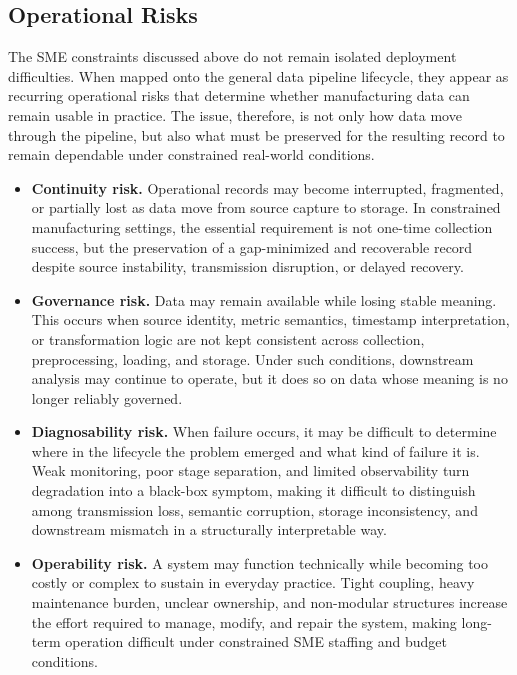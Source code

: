 \documentclass[systems,article,submit,pdftex,moreauthors]{Definitions/mdpi}
\begin{document}
\subsection{Operational Risks}
\label{sec:operational_risks}

The SME constraints discussed above do not remain isolated deployment difficulties. When mapped onto the general data pipeline lifecycle, they appear as recurring operational risks that determine whether manufacturing data can remain usable in practice. The issue, therefore, is not only how data move through the pipeline, but also what must be preserved for the resulting record to remain dependable under constrained real-world conditions.

\begin{itemize}[leftmargin=1.5em]
    \item[\textbf{RSK1.}] \textbf{Continuity risk.} Operational records may become interrupted, fragmented, or partially lost as data move from source capture to storage. In constrained manufacturing settings, the essential requirement is not one-time collection success, but the preservation of a gap-minimized and recoverable record despite source instability, transmission disruption, or delayed recovery.

    \item[\textbf{RSK2.}] \textbf{Governance risk.} Data may remain available while losing stable meaning. This occurs when source identity, metric semantics, timestamp interpretation, or transformation logic are not kept consistent across collection, preprocessing, loading, and storage. Under such conditions, downstream analysis may continue to operate, but it does so on data whose meaning is no longer reliably governed.

    \item[\textbf{RSK3.}] \textbf{Diagnosability risk.} When failure occurs, it may be difficult to determine where in the lifecycle the problem emerged and what kind of failure it is. Weak monitoring, poor stage separation, and limited observability turn degradation into a black-box symptom, making it difficult to distinguish among transmission loss, semantic corruption, storage inconsistency, and downstream mismatch in a structurally interpretable way.

    \item[\textbf{RSK4.}] \textbf{Operability risk.} A system may function technically while becoming too costly or complex to sustain in everyday practice. Tight coupling, heavy maintenance burden, unclear ownership, and non-modular structures increase the effort required to manage, modify, and repair the system, making long-term operation difficult under constrained SME staffing and budget conditions.


\end{itemize}
\end{document}
